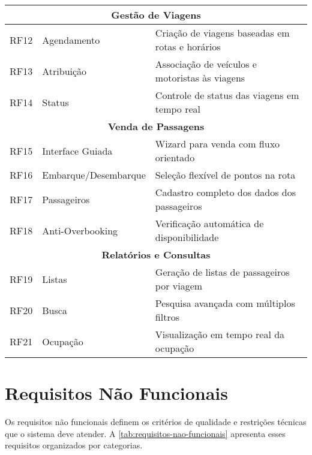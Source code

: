 \begin{table}[h!]
{\begin{tabular}{|c|l|p{8cm}|}
      \hline
      \multicolumn{3}{|c|}{\textbf{Gestão de Viagens}}                                            \\
      \hline
      RF12        & Agendamento          & Criação de viagens baseadas em rotas e horários        \\
      RF13        & Atribuição           & Associação de veículos e motoristas às viagens         \\
      RF14        & Status               & Controle de status das viagens em tempo real           \\
      \hline
      \multicolumn{3}{|c|}{\textbf{Venda de Passagens}}                                           \\
      \hline
      RF15        & Interface Guiada     & Wizard para venda com fluxo orientado                  \\
      RF16        & Embarque/Desembarque & Seleção flexível de pontos na rota                     \\
      RF17        & Passageiros          & Cadastro completo dos dados dos passageiros            \\
      RF18        & Anti-Overbooking     & Verificação automática de disponibilidade              \\
      \hline
      \multicolumn{3}{|c|}{\textbf{Relatórios e Consultas}}                                       \\
      \hline
      RF19        & Listas               & Geração de listas de passageiros por viagem            \\
      RF20        & Busca                & Pesquisa avançada com múltiplos filtros                \\
      RF21        & Ocupação             & Visualização em tempo real da ocupação                 \\
      \hline
    \end{tabular}
  }
\end{table}

\section{Requisitos Não Funcionais}

Os requisitos não funcionais definem os critérios de qualidade e restrições técnicas que o sistema deve atender. A \autoref{tab:requisitos-nao-funcionais} apresenta esses requisitos organizados por categorias.

